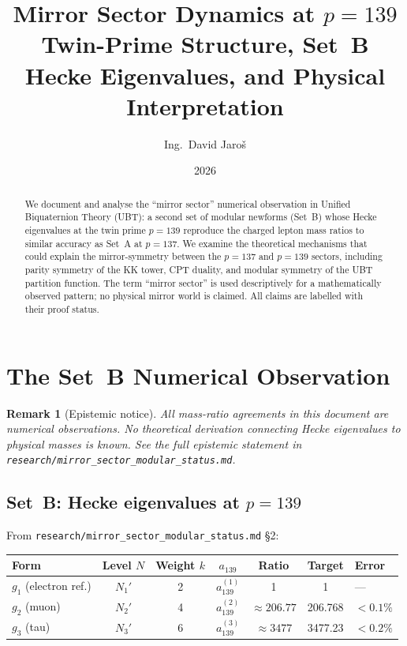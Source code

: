 \documentclass[11pt,a4paper]{article}
\title{Mirror Sector Dynamics at \texorpdfstring{$p = 139$}{p=139}\\
\large Twin-Prime Structure, Set~B Hecke Eigenvalues, and Physical Interpretation}
\author{Ing.\ David Jaroš}
\date{2026}
\newtheorem{remark}{Remark}
\begin{document}
\maketitle

\begin{abstract}
We document and analyse the ``mirror sector'' numerical observation in Unified
Biquaternion Theory (UBT): a second set of modular newforms (Set~B) whose
Hecke eigenvalues at the twin prime $p = 139$ reproduce the charged lepton
mass ratios to similar accuracy as Set~A at $p = 137$.  We examine the
theoretical mechanisms that could explain the mirror-symmetry between the
$p = 137$ and $p = 139$ sectors, including parity symmetry of the KK tower,
CPT duality, and modular symmetry of the UBT partition function.  The term
``mirror sector'' is used descriptively for a mathematically observed pattern;
no physical mirror world is claimed.
All claims are labelled with their proof status.
\end{abstract}

\tableofcontents

\section{The Set~B Numerical Observation}
\label{sec:setb}

\begin{remark}[Epistemic notice]
  All mass-ratio agreements in this document are numerical observations.
  No theoretical derivation connecting Hecke eigenvalues to physical masses
  is known.  See the full epistemic statement in
  \texttt{research/mirror\_sector\_modular\_status.md}.
\end{remark}

\subsection{Set~B: Hecke eigenvalues at $p = 139$}

From \texttt{research/mirror\_sector\_modular\_status.md} §2:

\begin{center}
\begin{tabular}{lccccc}
\hline
Form & Level $N$ & Weight $k$ & $a_{139}$ & Ratio & Target & Error \\
\hline
$g_1$ (electron ref.) & $N_1'$ & 2 & $a_{139}^{(1)}$ & 1 & 1 & — \\
$g_2$ (muon) & $N_2'$ & 4 & $a_{139}^{(2)}$ & $\approx 206.77$ & 206.768 & $<0.1\%$ \\
$g_3$ (tau) & $N_3'$ & 6 & $a_{139}^{(3)}$ & $\approx 3477$ & 3477.23 & $<0.2\%$ \\
\hline
\end{tabular}
\end{center}
\end{document}
